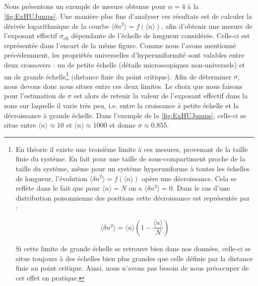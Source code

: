 \subparagraph{}Nous présentons un exemple de mesure obtenue pour $\alpha=4$ à la \autoref{fig:ExHUJumps}. Une manière plus fine d'analyser ces résultats est de calculer la dérivée logarithmique de la courbe $\langle \delta n^2 \rangle = f(\langle n \rangle)$, afin d'obtenir une mesure de l'exposant effectif $\sigma_\text{eff}$ dépendante de l'échelle de longueur considérée. Celle-ci est représentée dans l'encart de la même figure. Comme nous l'avons mentionné précédemment, les propriétés universelles d'hyperuniformité sont valables entre deux crossovers : un de petite échelle (détails microscopiques non-universels) et un de grande échelle\footnote{En théorie il existe une troisième limite à ces mesures, provenant de la taille finie du système. En fait pour une taille de sous-compartiment proche de la taille du système, même pour un système hyperuniforme à toutes les échelles de longueur, l'évolution  $\langle \delta n^2 \rangle = f(\langle n \rangle)$ opère une décroissance. Cela se reflète dans le fait que pour $\langle n \rangle = N$ on a $\langle \delta n^2 \rangle =0$. Dans le cas d'une distribution poisonnienne des positions cette décroissance est représentée par :

\begin{equation}
	 \langle \delta n^2 \rangle  = \langle n \rangle \left( 1-\frac{\langle n \rangle}{N} \right)
\end{equation}

\noindent Si cette limite de grande échelle se retrouve bien dans nos données, celle-ci se situe toujours à des échelles bien plus grandes que celle définie par la distance finie au point critique. Ainsi, nous n'avons pas besoin de nous préoccuper de cet effet en pratique.} (distance finie du point critique). Afin de déterminer $\sigma$, nous devons donc nous situer entre ces deux limites. Le choix que nous faisons pour l'estimation de $\sigma$ est alors de retenir la valeur de l'exposant effectif dans la zone sur laquelle il varie très peu, i.e. entre la croissance à petite échelle et la décroissance à grande échelle. Dans l'exemple de la \autoref{fig:ExHUJumps}, celle-ci se situe entre $\langle n \rangle \approx 10$ et $\langle n \rangle \approx 1000$ et donne $\sigma\approx 0.855$.

